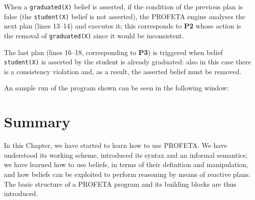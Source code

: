 When a \texttt{graduated(X)} belief is asserted, if the condition of the
previous plan is false (the \texttt{student(X)} belief is not asserted),
the PROFETA engine analyses the next plan (lines
13--14) and executes it; this corresponds to \textbf{P2} whose action
is the removal of \texttt{graduated(X)} since it would be inconsistent.

The last plan (lines 16--18, corresponding to \textbf{P3}) is triggered
when belief \texttt{student(X)} is asserted by the student is already
graduated: also in this case there is a consistency violation and, as a
result, the asserted belief must be removed.

An sample run of the program shown can be seen in the following window:


\section{Summary}
In this Chapter, we have started to learn how to use PROFETA.
We have understood its working scheme, introduced its syntax and an
informal semantics;
we have learned how to use beliefs, in terms of their definition and
manipulation, and how beliefs can be exploited to perform reasoning by
means of reactive plans.
The basic structure of a PROFETA program and its building blocks are thus
introduced.



